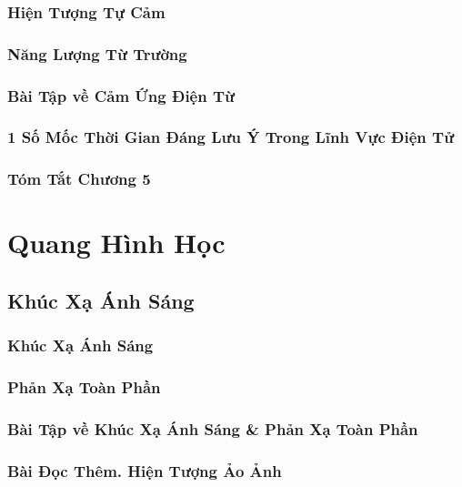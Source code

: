 \documentclass[oneside]{book}
\numberwithin{equation}{section}
\begin{document}
\section{Hiện Tượng Tự Cảm}

\section{Năng Lượng Từ Trường}

\section{Bài Tập về Cảm Ứng Điện Từ}

\section{1 Số Mốc Thời Gian Đáng Lưu Ý Trong Lĩnh Vực Điện Tử}

\section{Tóm Tắt Chương 5}


\part{Quang Hình Học}

\chapter{Khúc Xạ Ánh Sáng}

\section{Khúc Xạ Ánh Sáng}

\section{Phản Xạ Toàn Phần}

\section{Bài Tập về Khúc Xạ Ánh Sáng \& Phản Xạ Toàn Phần}

\section{Bài Đọc Thêm. Hiện Tượng Ảo Ảnh}
\end{document}
